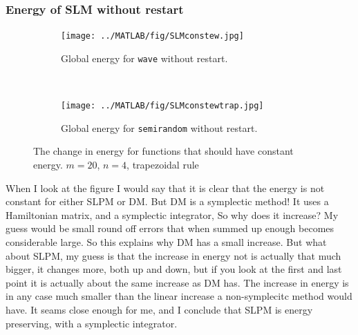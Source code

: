 \subsubsection{Energy of SLM without restart}%

\begin{figure}[H]
        \centering
        \begin{subfigure}[b]{0.45\textwidth}
                \texttt{[image: ../MATLAB/fig/SLMconstew.jpg]}
                \caption{Global energy for \texttt{wave} without restart.}
                \label{fig:SLMconstew}
        \end{subfigure}
        ~
        \begin{subfigure}[b]{0.45\textwidth}
                \texttt{[image: ../MATLAB/fig/SLMconstewtrap.jpg]}
                \caption{Global energy for \texttt{semirandom} without restart.}
                \label{fig:SLMconstes}
        \end{subfigure}

        \caption{The change in energy for functions that should have constant energy. $m = 20$, $n = 4$, trapezoidal rule}
        \label{fig:SLMconste}
\end{figure}
When I look at the figure I would say that it is clear that the energy is not constant for either SLPM or DM. But DM is a symplectic method! It uses a Hamiltonian matrix, and a symplectic integrator, So why does it increase? My guess would be small round off errors that when summed up enough becomes considerable large. So this explains why DM has a small increase. But what about SLPM, my guess is that the increase in energy not is actually that much bigger, it changes more, both up and down, but if you look at the first and last point it is actually about the same increase as DM has. The increase in energy is in any case much smaller than the linear increase a non-symplecitc method would have. It seams close enough for me, and I conclude that SLPM is energy preserving, with a symplectic integrator.

